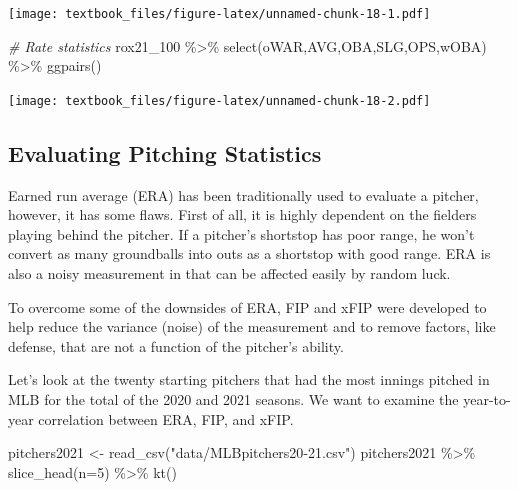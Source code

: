 \documentclass[
  11pt,
]{book}
\newenvironment{Shaded}{\begin{snugshade}}{\end{snugshade}}
\newcommand{\AttributeTok}[1]{\textcolor[rgb]{0.77,0.63,0.00}{#1}}
\newcommand{\CommentTok}[1]{\textcolor[rgb]{0.56,0.35,0.01}{\textit{#1}}}
\newcommand{\DecValTok}[1]{\textcolor[rgb]{0.00,0.00,0.81}{#1}}
\newcommand{\FunctionTok}[1]{\textcolor[rgb]{0.00,0.00,0.00}{#1}}
\newcommand{\NormalTok}[1]{#1}
\newcommand{\OtherTok}[1]{\textcolor[rgb]{0.56,0.35,0.01}{#1}}
\newcommand{\SpecialCharTok}[1]{\textcolor[rgb]{0.00,0.00,0.00}{#1}}
\newcommand{\StringTok}[1]{\textcolor[rgb]{0.31,0.60,0.02}{#1}}
\theoremstyle{definition}
\theoremstyle{definition}
\theoremstyle{definition}
\theoremstyle{definition}
\theoremstyle{remark}
\begin{document}
\texttt{[image: textbook\_files/figure-latex/unnamed-chunk-18-1.pdf]}

\begin{Shaded}
\begin{Highlighting}[]
\CommentTok{\# Rate statistics}
\NormalTok{rox21\_100 }\SpecialCharTok{\%\textgreater{}\%} \FunctionTok{select}\NormalTok{(oWAR,AVG,OBA,SLG,OPS,wOBA) }\SpecialCharTok{\%\textgreater{}\%} \FunctionTok{ggpairs}\NormalTok{()}
\end{Highlighting}
\end{Shaded}

\texttt{[image: textbook\_files/figure-latex/unnamed-chunk-18-2.pdf]}

\newpage

\hypertarget{evaluating-pitching-statistics}{%
\subsection{Evaluating Pitching Statistics}\label{evaluating-pitching-statistics}}

Earned run average (ERA) has been traditionally used to evaluate a pitcher, however, it has some flaws. First of all, it is highly dependent on the fielders playing behind the pitcher. If a pitcher's shortstop has poor range, he won't convert as many groundballs into outs as a shortstop with good range. ERA is also a noisy measurement in that can be affected easily by random luck.

To overcome some of the downsides of ERA, FIP and xFIP were developed to help reduce the variance (noise) of the measurement and to remove factors, like defense, that are not a function of the pitcher's ability.

Let's look at the twenty starting pitchers that had the most innings pitched in MLB for the total of the 2020 and 2021 seasons. We want to examine the year-to-year correlation between ERA, FIP, and xFIP.

\begin{Shaded}
\begin{Highlighting}[]
\NormalTok{pitchers2021 }\OtherTok{\textless{}{-}} \FunctionTok{read\_csv}\NormalTok{(}\StringTok{"data/MLBpitchers20{-}21.csv"}\NormalTok{)}
\NormalTok{pitchers2021 }\SpecialCharTok{\%\textgreater{}\%} \FunctionTok{slice\_head}\NormalTok{(}\AttributeTok{n=}\DecValTok{5}\NormalTok{) }\SpecialCharTok{\%\textgreater{}\%} \FunctionTok{kt}\NormalTok{()}
\end{Highlighting}
\end{Shaded}
\end{document}
